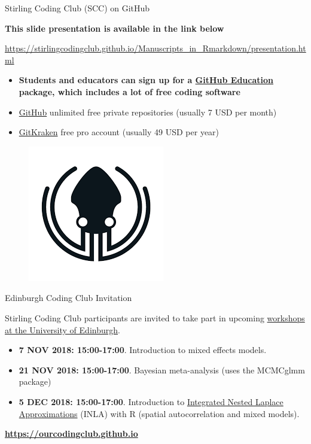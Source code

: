\documentclass[ignorenonframetext,]{beamer}
\providecommand{\tightlist}{%
\setlength{\itemsep}{0pt}\setlength{\parskip}{0pt}}
\begin{document}
\begin{frame}{Stirling Coding Club (SCC) on GitHub}

\textbf{This slide presentation is available in the link below}

\url{https://stirlingcodingclub.github.io/Manuscripts_in_Rmarkdown/presentation.html}

\begin{itemize}
\tightlist
\item
  \textbf{Students and educators can sign up for a
  \href{https://education.github.com/pack}{GitHub Education} package,
  which includes a lot of free coding software}
\item
  \href{http://github.com}{GitHub} unlimited free private repositories
  (usually 7 USD per month)
\item
  \href{http://gitkraken.com}{GitKraken} free pro account (usually 49
  USD per year)
\end{itemize}

\begin{figure}[htbp]
\centering
\includegraphics{images/gitkraken.png}
\caption{}
\end{figure}

\end{frame}

\begin{frame}{Edinburgh Coding Club Invitation}

Stirling Coding Club participants are invited to take part in upcoming
\href{https://ourcodingclub.github.io/}{workshops at the University of
Edinburgh}.

\begin{itemize}
\tightlist
\item
  \textbf{7 NOV 2018: 15:00-17:00}. Introduction to mixed effects
  models.
\item
  \textbf{21 NOV 2018: 15:00-17:00}. Bayesian meta-analysis (uses the
  MCMCglmm package)
\item
  \textbf{5 DEC 2018: 15:00-17:00}. Introduction to
  \href{https://inla.r-inla-download.org/r-inla.org/papers/inla-rss.pdf}{Integrated
  Nested Laplace Approximations} (INLA) with R (spatial autocorrelation
  and mixed models).
\end{itemize}

\textbf{\url{https://ourcodingclub.github.io}}

\end{frame}
\end{document}
